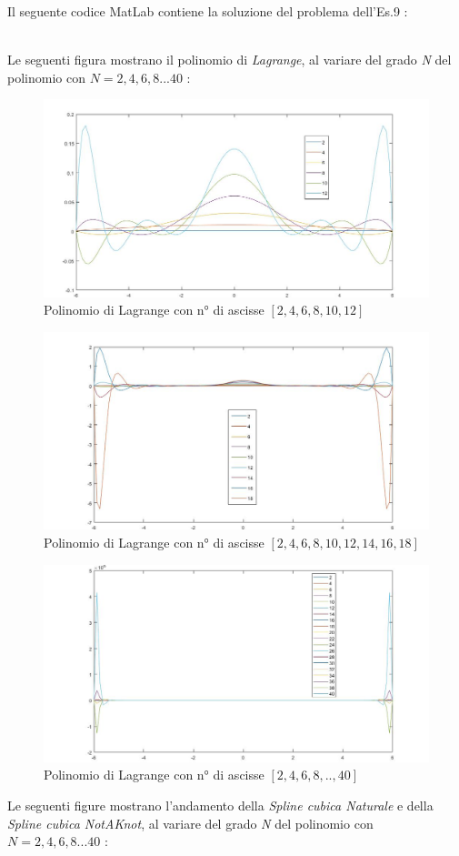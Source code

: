 Il seguente codice MatLab contiene la soluzione del problema dell'Es.9 :\\\
	
Le seguenti figura mostrano il polinomio di \textit{Lagrange}, al variare del grado \textit{N} del polinomio con $N=2,4,6,8...40$ :
	\begin{figure}[H]
		\label{Cap_4_Es_9_1}
		\includegraphics[width=\textwidth]{Plot/Cap_4_Es_9_1}
		\caption*{Polinomio di Lagrange con n° di ascisse $[2,4,6,8,10,12]$}
	\end{figure}
	\begin{figure}[H]
		\label{Cap_4_Es_9_2}
		\includegraphics[width=\textwidth]{Plot/Cap_4_Es_9_2}
		\caption*{Polinomio di Lagrange con n° di ascisse $[2,4,6,8,10,12,14,16,18]$}
	\end{figure}
	\begin{figure}[H]
		\label{Cap_4_Es_9_2}
		\includegraphics[width=\textwidth]{Plot/Cap_4_Es_9_3}
		\caption*{Polinomio di Lagrange con n° di ascisse $[2,4,6,8,..,40]$}
	\end{figure}
Le seguenti figure mostrano l'andamento della \textit{Spline cubica Naturale} e della \textit{Spline cubica NotAKnot}, al variare del grado \textit{N} del polinomio con $N=2,4,6,8...40$ :\\\


